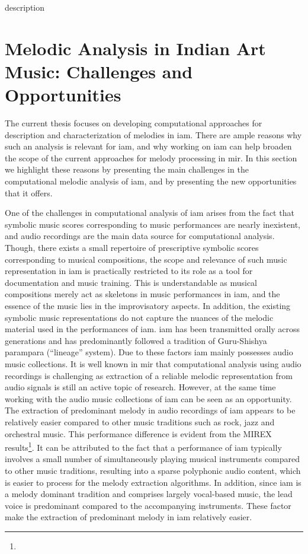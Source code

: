 description 
\section{Melodic Analysis in Indian Art Music: Challenges and Opportunities}
\label{sec:intro_challenges_oppurtunities}

The current thesis focuses on developing computational approaches for description and characterization of melodies in \gls{iam}. There are ample reasons why such an analysis is relevant for \gls{iam}, and why working on \gls{iam} can help broaden the scope of the current approaches for melody processing in \gls{mir}. In this section we highlight these reasons by presenting the main challenges in the computational melodic analysis of \gls{iam}, and by presenting the new opportunities that it offers. 


One of the challenges in computational analysis of \gls{iam} arises from the fact that symbolic music scores corresponding to music performances are nearly inexistent, and audio recordings are the main data source for computational analysis.  Though, there exists a small repertoire of prescriptive symbolic scores corresponding to musical compositions, the scope and relevance of such music representation in \gls{iam} is practically restricted to its role as a tool for documentation and music training. This is understandable as musical compositions merely act as skeletons in music performances in \gls{iam}, and the essence of the music lies in the improvisatory aspects. In addition, the existing symbolic music representations do not capture the nuances of the melodic material used in the performances of \gls{iam}. \gls{iam} has been transmitted orally across generations and has predominantly followed a tradition of Guru-Shishya parampara (``lineage'' system).  Due to these factors \gls{iam} mainly possesses audio music collections. It is well known in \gls{mir} that computational analysis using audio recordings is challenging as extraction of a reliable melodic representation from audio signals is still an active topic of research. However, at the same time working with the audio music collections of \gls{iam} can be seen as an opportunity.  The extraction of predominant melody in audio recordings of \gls{iam} appears to be relatively easier compared to other music traditions such as rock, jazz and orchestral music. This performance difference is evident from the MIREX results\footnote{}. It can be attributed to the fact that a performance of \gls{iam} typically involves a small number of simultaneously playing musical instruments compared to other music traditions, resulting into a sparse polyphonic audio content, which is easier to process for the melody extraction algorithms. In addition, since \gls{iam} is a melody dominant tradition and comprises largely vocal-based music, the lead voice is predominant compared to the accompanying instruments. These factor make the extraction of predominant melody in \gls{iam} relatively easier. 

